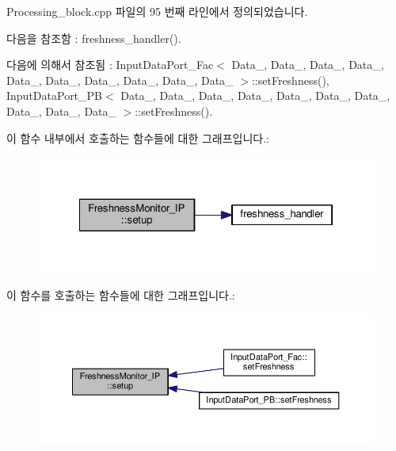 Processing\+\_\+block.\+cpp 파일의 95 번째 라인에서 정의되었습니다.



다음을 참조함 \+:  freshness\+\_\+handler().



다음에 의해서 참조됨 \+:  Input\+Data\+Port\+\_\+\+Fac$<$ Data\+\_, Data\+\_, Data\+\_, Data\+\_, Data\+\_, Data\+\_, Data\+\_, Data\+\_, Data\+\_, Data\+\_ $>$\+::set\+Freshness(), Input\+Data\+Port\+\_\+\+P\+B$<$ Data\+\_, Data\+\_, Data\+\_, Data\+\_, Data\+\_, Data\+\_, Data\+\_, Data\+\_, Data\+\_, Data\+\_ $>$\+::set\+Freshness().



이 함수 내부에서 호출하는 함수들에 대한 그래프입니다.\+:\nopagebreak
\begin{figure}[H]
\begin{center}
\leavevmode
\includegraphics[width=322pt]{classFreshnessMonitor__IP_a5270577609116294857dbd2192fade7d_cgraph}
\end{center}
\end{figure}




이 함수를 호출하는 함수들에 대한 그래프입니다.\+:\nopagebreak
\begin{figure}[H]
\begin{center}
\leavevmode
\includegraphics[width=350pt]{classFreshnessMonitor__IP_a5270577609116294857dbd2192fade7d_icgraph}
\end{center}
\end{figure}




